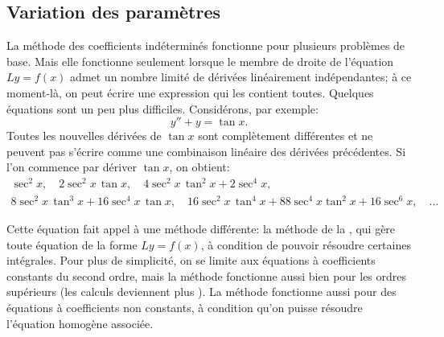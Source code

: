 \subsection{Variation des paramètres}

La méthode des coefficients indéterminés fonctionne pour plusieurs problèmes de base. Mais elle fonctionne seulement lorsque le membre de droite de l'équation  $Ly = f(x)$ 
admet un nombre limité de dérivées linéairement indépendantes; à ce moment-là, on peut écrire une expression qui les contient toutes. Quelques équations sont un peu plus difficiles. Considérons, par exemple: 
\begin{equation*}
	y''+y = \tan x .
\end{equation*}
Toutes les nouvelles dérivées de $\tan x$ sont complètement différentes et ne peuvent pas s'écrire comme une combinaison linéaire des dérivées précédentes. Si l'on commence par dériver  $\tan x$, on obtient:
\begin{multline*}
 	  \sec^2 x, \quad
	2 \sec^2 x \, \tan x, \quad
	4 \sec^2 x \, \tan^2 x + 2 \sec^4 x, \\
	8 \sec^2 x \, \tan^3 x + 16 \sec^4 x \, \tan x, \quad
	16\sec^2 x \, \tan^4 x + 88 \sec^4 x \tan^2 x + 16 \sec^6 x, \quad
	\ldots
\end{multline*}

Cette équation fait appel à une méthode différente: la méthode de la
\emph{}, qui gère toute équation de
la forme $Ly = f(x)$, à condition de pouvoir résoudre certaines intégrales.  
Pour plus de simplicité, on se limite  aux équations à coefficients constants du second ordre,
mais la méthode fonctionne aussi bien pour les ordres supérieurs (les calculs deviennent plus
). %
La méthode fonctionne aussi pour des équations à coefficients non constants, 
à condition qu'on puisse résoudre l'équation homogène associée.  

